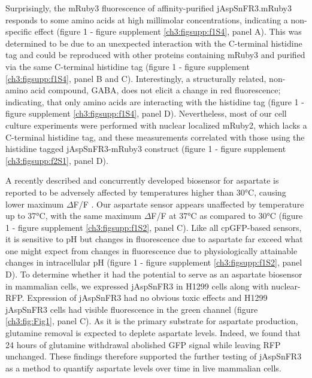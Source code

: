 Surprisingly, the mRuby3 fluorescence of affinity-purified jAspSnFR3.mRuby3 responds to some amino acids at high millimolar concentrations, indicating a non-specific effect (figure 1 - figure supplement \ref{ch3:figsupp:f1S4}, panel A).
This was determined to be due to an unexpected interaction with the C-terminal histidine tag and could be reproduced with other proteins containing mRuby3 and purified via the same C-terminal histidine tag (figure 1 - figure supplement \ref{ch3:figsupp:f1S4}, panel B and C).
Interestingly, a structurally related, non-amino acid compound, GABA, does not elicit a change in red fluorescence; indicating, that only amino acids are interacting with the histidine tag (figure 1 - figure supplement \ref{ch3:figsupp:f1S4}, panel D).
Nevertheless, most of our cell culture experiments were performed with nuclear localized mRuby2, which lacks a C-terminal histidine tag, and these measurements correlated with those using the histidine tagged jAspSnFR3-mRuby3 construct (figure 1 - figure supplement \ref{ch3:figsupp:f2S1}, panel D).

A recently described and concurrently developed biosensor for aspartate is reported to be adversely affected by temperatures higher than 30°C, causing lower maximum $\Delta$F/F \cite{Hellweg2023}.
Our aspartate sensor appears unaffected by temperature up to 37°C, with the same maximum $\Delta$F/F at 37°C as compared to 30°C (figure 1 - figure supplement \ref{ch3:figsupp:f1S2}, panel C).
Like all cpGFP-based sensors, it is sensitive to pH but changes in fluorescence due to aspartate far exceed what one might expect from changes in fluorescence due to physiologically attainable changes in intracellular pH (figure 1 - figure supplement \ref{ch3:figsupp:f1S2}, panel D).
To determine whether it had the potential to serve as an aspartate biosensor in mammalian cells, we expressed jAspSnFR3 in H1299 cells along with nuclear-RFP.
Expression of jAspSnFR3 had no obvious toxic effects and H1299 jAspSnFR3 cells had visible fluorescence in the green channel (figure \ref{ch3:fig:Fig1}, panel C).
As it is the primary substrate for aspartate production, glutamine removal is expected to deplete aspartate levels.
Indeed, we found that 24 hours of glutamine withdrawal abolished GFP signal while leaving RFP unchanged.
These findings therefore supported the further testing of jAspSnFR3 as a method to quantify aspartate levels over time in live mammalian cells.

